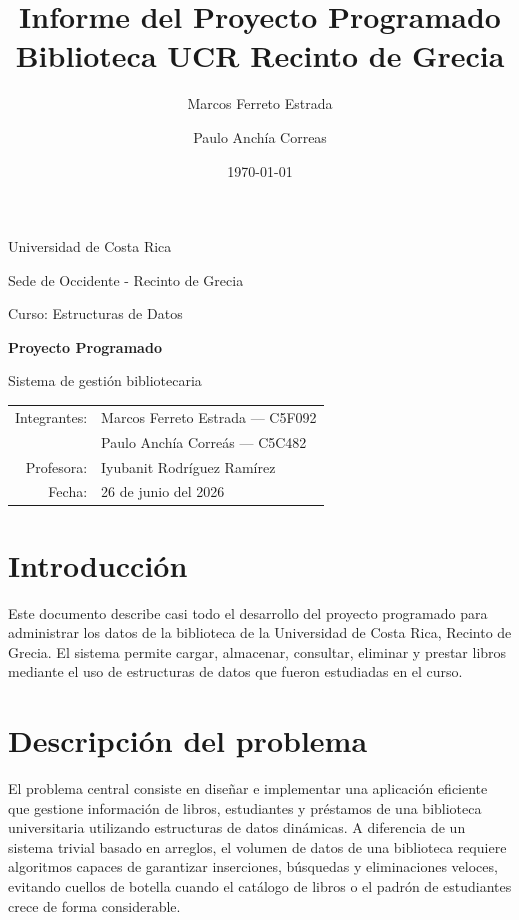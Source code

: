 \documentclass[11pt]{article}
\title{Informe del Proyecto Programado\\Biblioteca UCR Recinto de Grecia}
\author{Marcos Ferreto Estrada \and Paulo Anchía Correas}
\date{\today}
\begin{document}
\begin{titlepage}
    \centering
    {\Large Universidad de Costa Rica\par}
    {\large Sede de Occidente - Recinto de Grecia\par}
    {\large Curso: Estructuras de Datos\par}

    \vspace{2.5cm}
    {\LARGE\bfseries Proyecto Programado\par}
    {\Large Sistema de gestión bibliotecaria\par}

    \vspace{2.5cm}
    \begin{tabular}{rl}
        Integrantes: & Marcos Ferreto Estrada --- C5F092 \\
                     & Paulo Anchía Correás --- C5C482 \\
        Profesora:   & Iyubanit Rodríguez Ramírez \\
        Fecha:       & 26 de junio del 2026 \\
    \end{tabular}

    \vfill
\end{titlepage}

\tableofcontents
\newpage

\section{Introducción}

Este documento describe casi todo el desarrollo del proyecto programado para administrar los datos de la biblioteca de la Universidad de Costa Rica, Recinto de Grecia. El sistema permite cargar, almacenar, consultar, eliminar y prestar libros mediante el uso de estructuras de datos que fueron estudiadas en el curso. 

\section{Descripción del problema}

El problema central consiste en diseñar e implementar una aplicación eficiente que gestione información de libros, estudiantes y préstamos de una biblioteca universitaria utilizando estructuras de datos dinámicas. A diferencia de un sistema trivial basado en arreglos, el volumen de datos de una biblioteca requiere algoritmos capaces de garantizar inserciones, búsquedas y eliminaciones veloces, evitando cuellos de botella cuando el catálogo de libros o el padrón de estudiantes crece de forma considerable.
\end{document}
